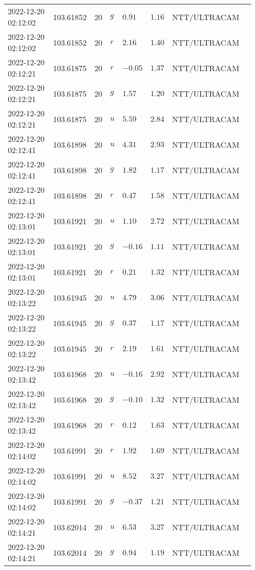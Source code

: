 \documentclass{nature_plusfigure}
\begin{document}
\begin{supplement}
\begin{center}
\begin{longtable}{llllllll}
2022-12-20 02:12:02 & 103.61852 & 20 & $g$ & $0.91$ & $1.16$ & NTT/ULTRACAM &  \\ 
2022-12-20 02:12:02 & 103.61852 & 20 & $r$ & $2.16$ & $1.40$ & NTT/ULTRACAM &  \\ 
2022-12-20 02:12:21 & 103.61875 & 20 & $r$ & $-0.05$ & $1.37$ & NTT/ULTRACAM &  \\ 
2022-12-20 02:12:21 & 103.61875 & 20 & $g$ & $1.57$ & $1.20$ & NTT/ULTRACAM &  \\ 
2022-12-20 02:12:21 & 103.61875 & 20 & $u$ & $5.59$ & $2.84$ & NTT/ULTRACAM &  \\ 
2022-12-20 02:12:41 & 103.61898 & 20 & $u$ & $4.31$ & $2.93$ & NTT/ULTRACAM &  \\ 
2022-12-20 02:12:41 & 103.61898 & 20 & $g$ & $1.82$ & $1.17$ & NTT/ULTRACAM &  \\ 
2022-12-20 02:12:41 & 103.61898 & 20 & $r$ & $0.47$ & $1.58$ & NTT/ULTRACAM &  \\ 
2022-12-20 02:13:01 & 103.61921 & 20 & $u$ & $1.10$ & $2.72$ & NTT/ULTRACAM &  \\ 
2022-12-20 02:13:01 & 103.61921 & 20 & $g$ & $-0.16$ & $1.11$ & NTT/ULTRACAM &  \\ 
2022-12-20 02:13:01 & 103.61921 & 20 & $r$ & $0.21$ & $1.32$ & NTT/ULTRACAM &  \\ 
2022-12-20 02:13:22 & 103.61945 & 20 & $u$ & $4.79$ & $3.06$ & NTT/ULTRACAM &  \\ 
2022-12-20 02:13:22 & 103.61945 & 20 & $g$ & $0.37$ & $1.17$ & NTT/ULTRACAM &  \\ 
2022-12-20 02:13:22 & 103.61945 & 20 & $r$ & $2.19$ & $1.61$ & NTT/ULTRACAM &  \\ 
2022-12-20 02:13:42 & 103.61968 & 20 & $u$ & $-0.16$ & $2.92$ & NTT/ULTRACAM &  \\ 
2022-12-20 02:13:42 & 103.61968 & 20 & $g$ & $-0.10$ & $1.32$ & NTT/ULTRACAM &  \\ 
2022-12-20 02:13:42 & 103.61968 & 20 & $r$ & $0.12$ & $1.63$ & NTT/ULTRACAM &  \\ 
2022-12-20 02:14:02 & 103.61991 & 20 & $r$ & $1.92$ & $1.69$ & NTT/ULTRACAM &  \\ 
2022-12-20 02:14:02 & 103.61991 & 20 & $u$ & $8.52$ & $3.27$ & NTT/ULTRACAM &  \\ 
2022-12-20 02:14:02 & 103.61991 & 20 & $g$ & $-0.37$ & $1.21$ & NTT/ULTRACAM &  \\ 
2022-12-20 02:14:21 & 103.62014 & 20 & $u$ & $6.53$ & $3.27$ & NTT/ULTRACAM &  \\ 
2022-12-20 02:14:21 & 103.62014 & 20 & $g$ & $0.94$ & $1.19$ & NTT/ULTRACAM &  \\ 

\end{longtable}
\end{center}
\end{supplement}
\end{document}
